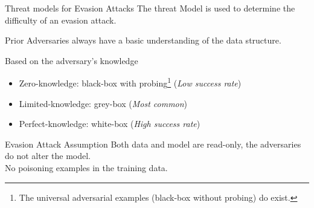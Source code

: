 \documentclass[9pt]{beamer}
\begin{document}
\begin{frame}{Threat models for Evasion Attacks}
The threat Model is used to determine the difficulty of an evasion attack.

\begin{block}{Prior}
Adversaries always have a basic understanding of the data structure.
\end{block}

Based on the adversary's knowledge

\begin{itemize}
    \item Zero-knowledge: black-box with probing\footnote{The universal adversarial examples (black-box without probing) do exist.} (\textit{Low success rate})
    \item Limited-knowledge: grey-box (\textit{Most common})
    \item Perfect-knowledge: white-box (\textit{High success rate})
\end{itemize}

\begin{alertblock}{Evasion Attack Assumption}
Both data and model are read-only, the adversaries do not alter the model.\\
No poisoning examples in the training data.
\end{alertblock}
\end{frame}
\end{document}
